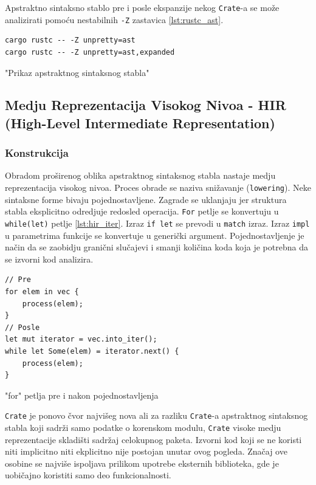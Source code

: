 \documentclass[11pt]{article}
\begin{document}
Apstraktno sintaksno stablo pre i posle ekspanzije nekog \verb|Crate|-a se može analizirati pomoću 
nestabilnih \verb|-Z| zastavica \ref{lst:rustc_ast}.

\begin{listing}[H]
\begin{verbatim}
cargo rustc -- -Z unpretty=ast
cargo rustc -- -Z unpretty=ast,expanded
\end{verbatim}
\caption{"Prikaz apstraktnog sintaksnog stabla"}
\label{lst:rustc_ast}
\end{listing}

\newpage
\subsection{Medju Reprezentacija Visokog Nivoa - HIR (High-Level Intermediate Representation)}


\subsubsection{Konstrukcija}

Obradom proširenog oblika apstraktnog sintaksnog stabla nastaje medju reprezentacija visokog nivoa.
Proces obrade se naziva snižavanje (\verb|lowering|). Neke sintaksne forme bivaju pojednostavljene.
Zagrade se uklanjaju jer struktura stabla eksplicitno odredjuje redosled operacija. \verb|For| petlje 
se konvertuju u \verb|while(let)| petlje \ref{lst:hir_iter}. Izraz \verb|if let| se prevodi 
u \verb|match| izraz. Izraz \verb|impl| u parametrima funkcije se konvertuje u generički argument.
Pojednostavljenje je način da se zaobidju granični slučajevi i smanji količina koda koja je potrebna 
da se izvorni kod analizira.

\begin{listing}[H]
\begin{verbatim}
// Pre
for elem in vec {
    process(elem);
}
// Posle
let mut iterator = vec.into_iter();
while let Some(elem) = iterator.next() {
    process(elem);
}
\end{verbatim}
\caption{"for" petlja pre i nakon pojednostavljenja}
\label{lst:hir_iter}
\end{listing}

\verb|Crate| je ponovo čvor najvišeg nova ali za razliku \verb|Crate|-a apstraktnog sintaksnog stabla koji sadrži
samo podatke o korenskom modulu, \verb|Crate| visoke medju reprezentacije skladišti sadržaj celokupnog paketa.
Izvorni kod koji se ne koristi niti implicitno niti ekplicitno nije postojan unutar ovog pogleda. Značaj 
ove osobine se najviše ispoljava prilikom upotrebe eksternih biblioteka, gde je uobičajno koristiti samo 
deo funkcionalnosti.
\end{document}
